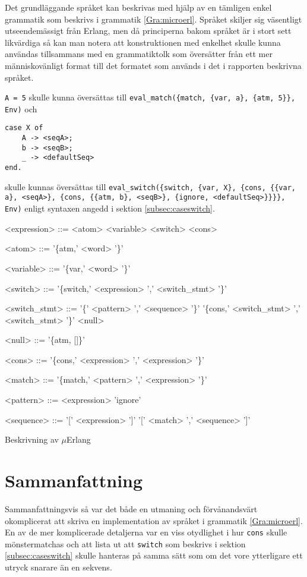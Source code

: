 \documentclass[a4paper, 11pt]{article}
\begin{document}
Det grundläggande språket kan beskrivas med hjälp av en tämligen enkel grammatik som beskrivs i grammatik \ref{Gra:microerl}. Språket skiljer sig väsentligt utseendemässigt från Erlang, men då principerna bakom språket är i stort sett likvärdiga så kan man notera att konstruktionen med enkelhet skulle kunna användas tillsammans med en grammatiktolk som översätter från ett mer människovänligt format till det formatet som används i det i rapporten beskrivna språket.

\lstinline$A = 5$ skulle kunna översättas till \lstinline$eval_match({match, {var, a}, {atm, 5}}, Env)$ och
\begin{lstlisting}
case X of
	A -> <seqA>;
	b -> <seqB>;
	_ -> <defaultSeq>
end.
\end{lstlisting}
skulle kunnas översättas till \lstinline$eval_switch({switch, {var, X}, {cons, {{var, a}, <seqA>}, {cons, {{atm, b}, <seqB>}, {ignore, <defaultSeq>}}}}, Env)$ enligt syntaxen angedd i sektion \ref{subsec:caseswitch}.

\begin{Grammar}
\begin{grammar}
<expression> ::= <atom>
\alt <variable>
\alt <switch>
\alt <cons>

<atom> ::= '\{atm,' <word> '\}'

<variable> ::= '\{var,' <word> '\}'

<switch> ::= '\{switch,' <expression> ',' <switch_stmt> '\}'

<switch_stmt> ::= '\{' <pattern> ',' <sequence> '\}'
\alt '\{cons,' <switch_stmt> ',' <switch_stmt> '\}'
\alt <null>

<null> ::= '\{atm, []\}'

<cons> ::= '\{cons,' <expression> ',' <expression> '\}'

<match> ::= '\{match,' <pattern> ',' <expression> '\}'

<pattern> ::= <expression>
\alt 'ignore'

<sequence> ::= '[' <expression> ']'
	\alt '[' <match> ',' <sequence> ']'
\end{grammar}
\caption{Beskrivning av $\mu$Erlang}
\label{Gra:microerl}
\end{Grammar}

\section{Sammanfattning}
Sammanfattningsvis så var det både en utmaning och förvånandsvärt okomplicerat att skriva en implementation av språket i grammatik \ref{Gra:microerl}. En av de mer komplicerade detaljerna var en viss otydlighet i hur \texttt{cons} skulle mönstermatchas och att lista ut att \texttt{switch} som beskrivs i sektion \ref{subsec:caseswitch} skulle hanteras på samma sätt som om det vore ytterligare ett utryck snarare än en sekvens.
\end{document}
